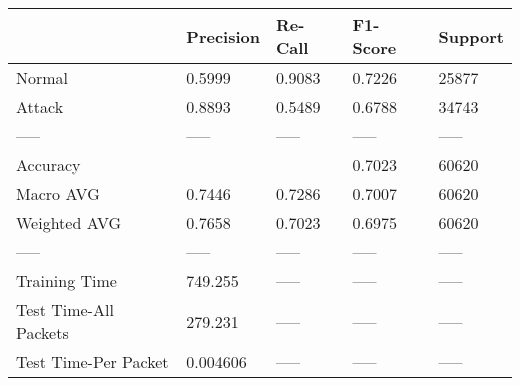 \begin{tabular}{lllll}
\toprule
{} & Precision & Re-Call & F1-Score & Support \\
\midrule
Normal                &    0.5999 &  0.9083 &   0.7226 &   25877 \\
Attack                &    0.8893 &  0.5489 &   0.6788 &   34743 \\
-----                 &     ----- &   ----- &    ----- &   ----- \\
Accuracy              &           &         &   0.7023 &   60620 \\
Macro AVG             &    0.7446 &  0.7286 &   0.7007 &   60620 \\
Weighted AVG          &    0.7658 &  0.7023 &   0.6975 &   60620 \\
-----                 &     ----- &   ----- &    ----- &   ----- \\
Training Time         &   749.255 &   ----- &    ----- &   ----- \\
Test Time-All Packets &   279.231 &   ----- &    ----- &   ----- \\
Test Time-Per Packet  &  0.004606 &   ----- &    ----- &   ----- \\
\bottomrule
\end{tabular}
